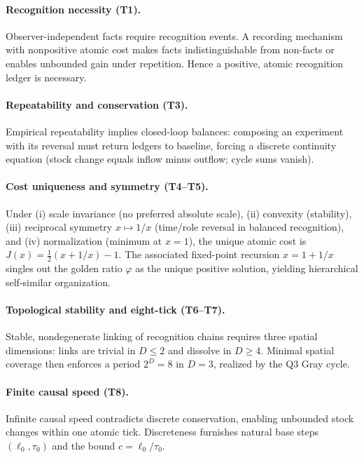 \documentclass[11pt]{article}
\begin{document}
\paragraph{Recognition necessity (T1).} Observer-independent facts require recognition events. A recording mechanism with nonpositive atomic cost makes facts indistinguishable from non-facts or enables unbounded gain under repetition. Hence a positive, atomic recognition ledger is necessary.

\paragraph{Repeatability and conservation (T3).} Empirical repeatability implies closed-loop balances: composing an experiment with its reversal must return ledgers to baseline, forcing a discrete continuity equation (stock change equals inflow minus outflow; cycle sums vanish).

\paragraph{Cost uniqueness and symmetry (T4--T5).} Under (i) scale invariance (no preferred absolute scale), (ii) convexity (stability), (iii) reciprocal symmetry \(x\mapsto 1/x\) (time/role reversal in balanced recognition), and (iv) normalization (minimum at \(x=1\)), the unique atomic cost is \(J(x)=\tfrac{1}{2}(x+1/x)-1\). The associated fixed-point recursion \(x=1+1/x\) singles out the golden ratio \(\varphi\) as the unique positive solution, yielding hierarchical self\mbox{-}similar organization.

\paragraph{Topological stability and eight\mbox{-}tick (T6--T7).} Stable, nondegenerate linking of recognition chains requires three spatial dimensions: links are trivial in \(D\le 2\) and dissolve in \(D\ge 4\). Minimal spatial coverage then enforces a period \(2^D=8\) in \(D=3\), realized by the Q3 Gray cycle.

\paragraph{Finite causal speed (T8).} Infinite causal speed contradicts discrete conservation, enabling unbounded stock changes within one atomic tick. Discreteness furnishes natural base steps \((\ell_0,\tau_0)\) and the bound \(c=\ell_0/\tau_0\).
\end{document}
